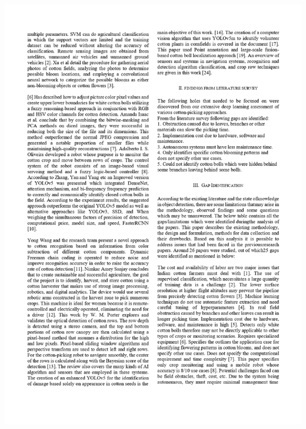 \documentclass[12pt,a4paper]{report}
\begin{document}
\includegraphics[scale=0.7]{images/copyright/publication/Publication/Publication_page-0002.jpg}
\newpage
\end{document}
